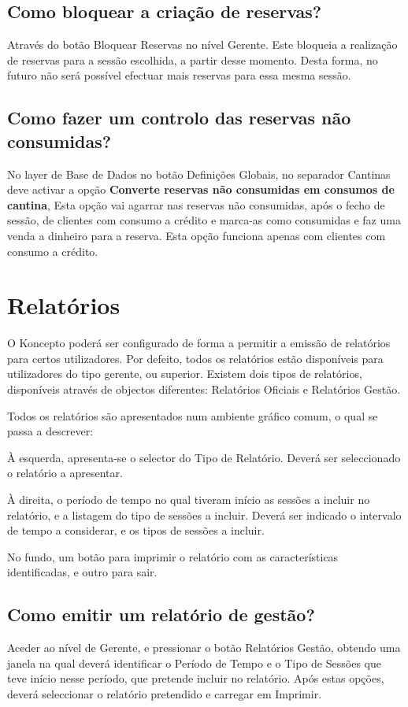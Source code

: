 \documentclass[a4paper,11pt,openany]{memoir}
\begin{document}
\section{Como bloquear a criação de reservas?}
Através do botão Bloquear Reservas no nível Gerente. Este bloqueia a realização de
reservas para a sessão escolhida, a partir desse momento. Desta forma, no futuro
não será possível efectuar mais reservas para essa mesma sessão.

\section{Como fazer um controlo das reservas não consumidas?}
No layer de Base de Dados no botão Definições Globais, no separador Cantinas
deve activar a opção \textbf{Converte reservas não consumidas em consumos de cantina},
Esta opção vai agarrar nas reservas não consumidas, após o fecho de sessão, de
clientes com consumo a crédito e marca-as como consumidas e faz uma venda a
dinheiro para a reserva. Esta opção funciona apenas com clientes com consumo a
crédito.

\chapter{Relatórios}

\label{reports}
O Koncepto poderá ser configurado de forma a permitir a emissão de relatórios para
certos utilizadores. Por defeito, todos os relatórios estão disponíveis para
utilizadores do tipo gerente, ou superior. Existem dois tipos de relatórios, disponíveis
através de objectos diferentes: Relatórios Oficiais e Relatórios Gestão.

Todos os relatórios são apresentados num ambiente gráfico comum, o qual se passa a
descrever:

À esquerda, apresenta-se o selector do Tipo de Relatório. Deverá ser seleccionado
o relatório a apresentar.

À direita, o período de tempo no qual tiveram início as sessões a incluir no relatório,
e a listagem do tipo de sessões a incluir. Deverá ser indicado o intervalo de tempo a
considerar, e os tipos de sessões a incluir.

No fundo, um botão para imprimir o relatório com as características identificadas, e
outro para sair.

\section{Como emitir um relatório de gestão?}
Aceder ao nível de Gerente, e pressionar o botão Relatórios Gestão, obtendo uma
janela na qual deverá identificar o Período de Tempo e o Tipo de Sessões que teve
início nesse período, que pretende incluir no relatório. Após estas opções, deverá
seleccionar o relatório pretendido e carregar em Imprimir.
\end{document}
